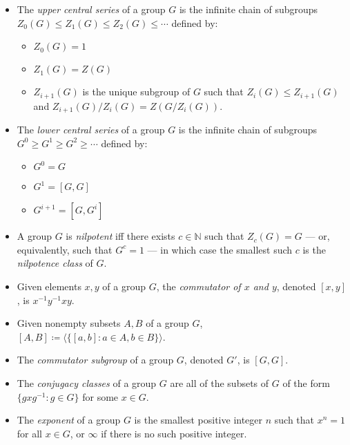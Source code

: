 \documentclass{article}
\newcommand{\N}{\mathbb{N}}
\newcommand{\gen}[1]{\langle #1\rangle}
\begin{document}
\begin{itemize}
\item The \emph{upper central series} of a group $G$ is the infinite chain of subgroups $Z_0(G)\leq Z_1(G)\leq Z_2(G)\leq \cdots$ defined by:
 \begin{itemize}
 \item $Z_0(G) = 1$
 \item $Z_1(G) = Z(G)$
 \item $Z_{i+1}(G)$ is the unique subgroup of $G$ such that $Z_i(G)\leq Z_{i+1}(G)$ and $Z_{i+1}(G)/Z_i(G) = Z(G/Z_i(G))$.
 \end{itemize}
\item The \emph{lower central series} of a group $G$ is the infinite chain of subgroups $G^0\geq G^1\geq G^2\geq \cdots$ defined by:
 \begin{itemize}
 \item $G^0 = G$
 \item $G^1 = [G,G]$
 \item $G^{i+1} = [G, G^i]$
 \end{itemize}
\item A group $G$ is \emph{nilpotent} iff there exists $c\in\N$ such that $Z_c(G) = G$ --- or, equivalently, such that $G^c = 1$ --- in which case the smallest such $c$ is the \emph{nilpotence class} of $G$.

\item Given elements $x,y$ of a group $G$, the \emph{commutator of $x$ and $y$}, denoted $[x,y]$, is $x^{-1}y^{-1}xy$.
\item Given nonempty subsets $A,B$ of a group $G$, $[A,B] \coloneqq \gen{\{[a,b] : a\in A, b\in B\}}$.
\item The \emph{commutator subgroup} of a group $G$, denoted $G'$, is $[G,G]$.
\item The \emph{conjugacy classes} of a group $G$ are all of the subsets of $G$ of the form $\{gxg^{-1} : g\in G\}$ for some $x\in G$.
\item The \emph{exponent} of a group $G$ is the smallest positive integer $n$ such that $x^n = 1$ for all $x\in G$, or $\infty$ if there is no such positive integer.

\end{itemize}
\end{document}
